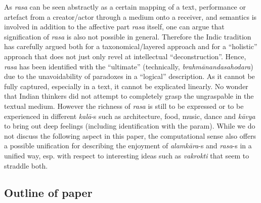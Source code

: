 As \textsl{rasa} can be seen abstractly as a certain mapping of a text, performance or artefact from a creator/actor through a medium onto a receiver, and semantics is involved in addition to the affective part \textsl{rasa} itself, one can argue that signification of \textsl{rasa} is also not possible in general. Therefore the Indic tradition has carefully argued both for a taxonomical/layered approach and for a “holistic” approach that does not just only revel at intellectual “deconstruction”. Hence, \textsl{rasa} has been identified with the “ultimate” (technically, \textsl{brahmānandasahodara}) due to the unavoidability of paradoxes in a “logical” description. As it cannot be fully captured, especially in a text, it cannot be explicated linearly. No wonder that Indian thinkers did not attempt to completely grasp the ungraspable in the textual medium. However the richness of \textsl{rasa} is still to be expressed or to be experienced in different \textsl{kalā}-s such as architecture, food, music, dance and \textsl{kāvya} to bring out deep feelings (including identification with the param). While we do not discuss the following aspect in this paper, the computational sense also offers a possible unification for describing the enjoyment of \textsl{alamkāra}-s and \textsl{rasa}-s in a unified way, esp. with respect to interesting ideas such as \textsl{vakrokti} that seem to straddle both.

\subsection{Outline of paper}\label{chap3-sec1.2}

